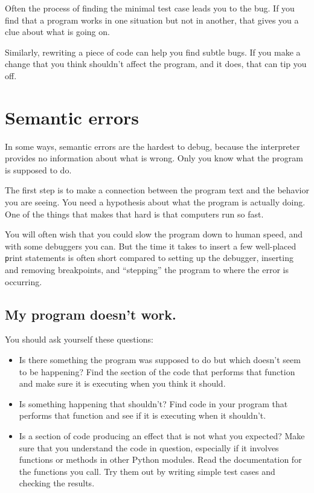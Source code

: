 \documentclass[
DIV=11,
fontsize=13,
twoside,
headinclude=false,
titlepage=firstiscover,
abstract=true,
headsepline=true,
footsepline=true,
chapterprefix=true, %
headings=big,
bibliography=totoc,%
captions=tableheading
]{scrbook}
\theoremstyle{definition}
\begin{document}
Often the process of finding the minimal test case leads you to the
bug.  If you find that a program works in one situation but not in
another, that gives you a clue about what is going on.

Similarly, rewriting a piece of code can help you find subtle
bugs.  If you make a change that you think shouldn't affect the
program, and it does, that can tip you off.


\section{Semantic errors}

In some ways, semantic errors are the hardest to debug,
because the interpreter provides no information
about what is wrong.  Only you know what the program is supposed to
do.

The first step is to make a connection between the program
text and the behavior you are seeing.  You need a hypothesis
about what the program is actually doing.  One of the things
that makes that hard is that computers run so fast.

You will often wish that you could slow the program down to human
speed, and with some debuggers you can.  But the time it takes to
insert a few well-placed {\texttt print} statements is often short compared to
setting up the debugger, inserting and removing breakpoints, and
``stepping'' the program to where the error is occurring.


\subsection{My program doesn't work.}

You should ask yourself these questions:

\begin{itemize}

\item Is there something the program was supposed to do but
which doesn't seem to be happening?  Find the section of the code
that performs that function and make sure it is executing when
you think it should.

\item Is something happening that shouldn't?  Find code in
your program that performs that function and see if it is
executing when it shouldn't.

\item Is a section of code producing an effect that is not
what you expected?  Make sure that you understand the code in
question, especially if it involves functions or methods in
other Python modules.  Read the documentation for the functions you call.
Try them out by writing simple test cases and checking the results.

\end{itemize}
\end{document}
